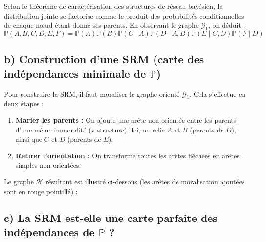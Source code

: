 \documentclass{article}
\begin{document}
Selon le théorème de caractérisation des structures de réseau bayésien, la distribution jointe se factorise comme le produit des probabilités conditionnelles de chaque nœud étant donné ses parents. En observant le graphe $\mathcal{G}_1$, on déduit :
\[ \mathbb{P}(A, B, C, D, E, F) = \mathbb{P}(A)\mathbb{P}(B)\mathbb{P}(C \mid A)\mathbb{P}(D \mid A, B)\mathbb{P}(E \mid C, D)\mathbb{P}(F \mid D) \]

\subsection*{b) Construction d'une SRM (carte des indépendances minimale de $\mathbb{P}$)}

Pour construire la SRM, il faut moraliser le graphe orienté $\mathcal{G}_1$. Cela s'effectue en deux étapes :
\begin{enumerate}
    \item \textbf{Marier les parents :} On ajoute une arête non orientée entre les parents d'une même immoralité (v-structure). Ici, on relie $A$ et $B$ (parents de $D$), ainsi que $C$ et $D$ (parents de $E$).
    \item \textbf{Retirer l'orientation :} On transforme toutes les arêtes fléchées en arêtes simples non orientées.
\end{enumerate}

Le graphe $\mathcal{H}$ résultant est illustré ci-dessous (les arêtes de moralisation ajoutées sont en rouge pointillé) :

\begin{center}
\end{center}

\subsection*{c) La SRM est-elle une carte parfaite des indépendances de $\mathbb{P}$ ?}
\end{document}
